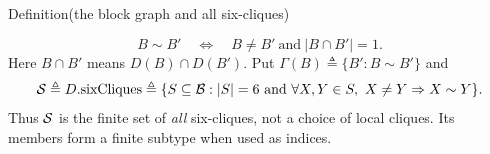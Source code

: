 \begin{mergedproofsection}
\begin{namedresult}{Definition}{(the block graph and all six-cliques)}\label{hc:def:graph}
 \leavevmode\par
 \[
 B\sim B'\quad\Longleftrightarrow\quad B\ne B'\ \text{and}\ |B\cap B'|=1.
 \]
 Here $B\cap B'$ means $D(B)\cap D(B')$.
 Put $\Gamma(B)\triangleq\{B':B\sim B'\}$ and
 \[
 {\mathcal S}\triangleq D.\mathrm{sixCliques}
   \triangleq\{S\subseteq{\mathcal B}:|S|=6\ \text{and}\
      \forall X,Y\in S,\ X\ne Y\Rightarrow X\sim Y\}.
 \]
 Thus ${\mathcal S}$ is the finite set of \emph{all} six-cliques, not a choice
 of local cliques. Its members form a finite subtype when used as indices.
\end{namedresult}

\begingroup\raggedright

\end{mergedproofsection}
